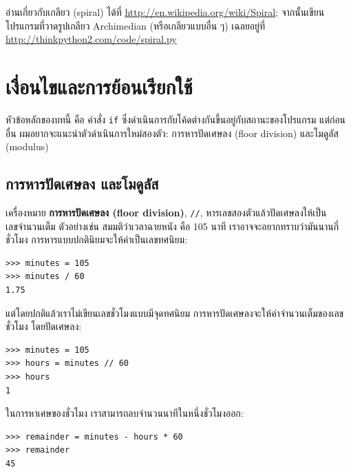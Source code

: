 \begin{exercise}

อ่านเกี่ยวกับเกลียว (spiral) ได้ที่ \url{http://en.wikipedia.org/wiki/Spiral}; 
จากนั้นเขียนโปรแกรมที่วาดรูปเกลียว Archimedian (หรือเกลียวแบบอื่น ๆ) 
เฉลยอยู่ที่ \url{http://thinkpython2.com/code/spiral.py}

\end{exercise}



\chapter{เงื่อนไขและการย้อนเรียกใช้}%

หัวข้อหลักของบทนี้ คือ คำสั่ง {\tt if} ซึ่งดำเนินการกับโค้ดต่างกันขึ้นอยู่กับสถานะของโปรแกรม
แต่ก่อนอื่น ผมอยากจะแนะนำตัวดำเนินการใหม่สองตัว: การหารปัดเศษลง (floor division) และโมดูลัส (modulus)


\section{การหารปัดเศษลง %
และโมดูลัส} %

เครื่องหมาย {\bf การหารปัดเศษลง (floor division)}, \verb"//", หารเลขสองตัวแล้วปัดเศษลงให้เป็นเลขจำนวนเต็ม
ตัวอย่างเช่น สมมติว่าเวลาฉายหนัง คือ 105 นาที เราอาจจะอยากทราบว่ามันนานกี่ชั่วโมง การหารแบบปกตินิยมจะให้ค่าเป็นเลขทศนิยม:

\begin{verbatim}
>>> minutes = 105
>>> minutes / 60
1.75
\end{verbatim}

แต่โดยปกติแล้วเราไม่เขียนเลขชั่วโมงแบบมีจุดทศนิยม การหารปัดเศษลงจะให้ค่าจำนวนเต็มของเลขชั่วโมง โดยปัดเศษลง:

\begin{verbatim}
>>> minutes = 105
>>> hours = minutes // 60
>>> hours
1
\end{verbatim}

ในการหาเศษของชั่วโมง เราสามารถลบจำนวนนาทีในหนึ่งชั่วโมงออก:

\begin{verbatim}
>>> remainder = minutes - hours * 60
>>> remainder
45
\end{verbatim}


